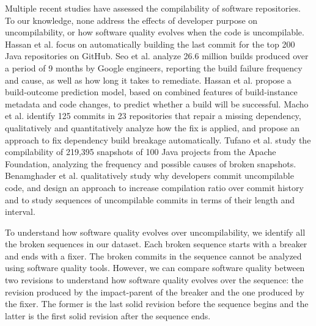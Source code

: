 Multiple recent studies \cite{8170083,Seo:2014:PBE:2568225.2568255,Hassan2017ESEM,macho2018automatically,SMR:SMR1838, pooyan_esem, pooyan_qrs} have assessed the compilability of software repositories. 
To our knowledge, none address the effects of developer purpose on uncompilability, or how software quality evolves when the code is uncompilable. 
Hassan et al. \cite{8170083} focus on automatically building the last commit for the top 200 Java repositories on GitHub.
Seo et al. \cite{Seo:2014:PBE:2568225.2568255} analyze 26.6 million builds produced over a period of 9 months by Google engineers, reporting the build failure frequency and cause, as well as how long it takes to remediate.
Hassan et al. \cite{Hassan2017ESEM} propose a build-outcome prediction model, based on combined features of build-instance metadata and code changes, to predict whether a build will be successful.
Macho et al. \cite{macho2018automatically} identify 125 commits in 23 repositories that repair a missing dependency, qualitatively and quantitatively analyze how the fix is applied, and propose an approach to fix dependency build breakage automatically.
Tufano et al. \cite{SMR:SMR1838} study the compilability of 219,395 snapshots of 100 Java projects from the Apache Foundation, analyzing the frequency and possible causes of broken snapshots.
Benamghader et al. \cite{pooyan_qrs} qualitatively study why developers commit uncompilable code, and design an approach \cite{pooyan_esem} to increase compilation ratio over commit history and to study sequences of uncompilable commits in terms of their length and interval.

To understand how software quality evolves over uncompilability, we identify all the broken sequences in our dataset.
Each broken sequence starts with a breaker and ends with a fixer. The broken commits in the sequence cannot be analyzed using software quality tools. 
However, we can compare software quality between two revisions to understand how software quality evolves over the sequence: the revision produced by the impact-parent of the breaker and the one produced by the fixer.
The former is the last solid revision before the sequence begins and the latter is the first solid revision after the sequence ends. 


